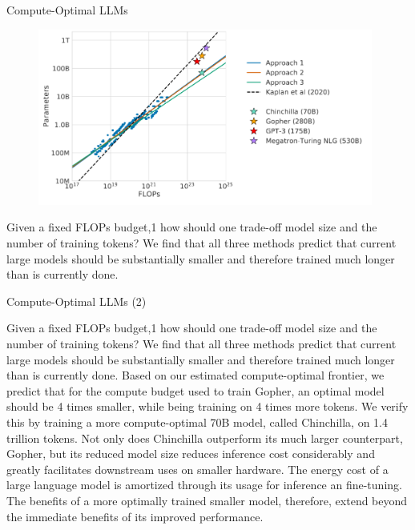 \begin{vbframe}{Compute-Optimal LLMs}

\vfill

\begin{figure}
	\centering
	\includegraphics[width = 11cm]{./figure/chinchilla.png} \\ 
\end{figure}

Given a fixed FLOPs budget,1 how should one trade-off model
size and the number of training tokens? 
We find that all three methods predict that current large
models should be substantially smaller and therefore trained
much longer than is currently done.


\vfill

\end{vbframe}

\begin{vbframe}{Compute-Optimal LLMs (2)}


Given a fixed FLOPs budget,1 how should one trade-off model
size and the number of training tokens? 
We find that all three methods predict that current large
models should be substantially smaller and therefore trained
much longer than is currently done.
Based on our estimated compute-optimal frontier, we predict
that for the compute budget used to train Gopher, an optimal
model should be 4 times smaller, while being training on 4
times more tokens. We verify this by training a more
compute-optimal 70B model, called Chinchilla, on 1.4
trillion tokens. Not only does Chinchilla outperform its
much larger counterpart, Gopher, but its reduced model size
reduces inference cost considerably and greatly facilitates
downstream uses on smaller hardware. The energy cost of a
large language model is amortized through its usage for
inference an fine-tuning. The benefits of a more optimally
trained smaller model, therefore, extend beyond the
immediate benefits of its improved performance.


\vfill

\end{vbframe}

